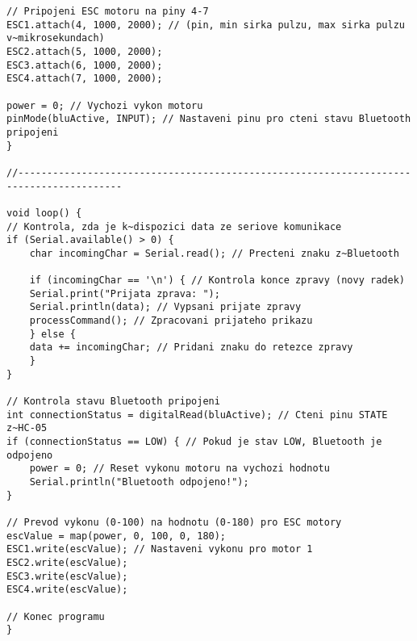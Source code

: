 \documentclass[12pt]{report}
\begin{document}
\begin{appendices}
\begin{lstlisting}[title={}, caption={}, label={}, basicstyle=\footnotesize\ttfamily, inputencoding=utf8]
// Pripojeni ESC motoru na piny 4-7
ESC1.attach(4, 1000, 2000); // (pin, min sirka pulzu, max sirka pulzu v~mikrosekundach)
ESC2.attach(5, 1000, 2000);
ESC3.attach(6, 1000, 2000);
ESC4.attach(7, 1000, 2000);

power = 0; // Vychozi vykon motoru
pinMode(bluActive, INPUT); // Nastaveni pinu pro cteni stavu Bluetooth pripojeni
}

//----------------------------------------------------------------------------------------

void loop() {
// Kontrola, zda je k~dispozici data ze seriove komunikace
if (Serial.available() > 0) {
	char incomingChar = Serial.read(); // Precteni znaku z~Bluetooth

	if (incomingChar == '\n') { // Kontrola konce zpravy (novy radek)
	Serial.print("Prijata zprava: ");
	Serial.println(data); // Vypsani prijate zpravy
	processCommand(); // Zpracovani prijateho prikazu
	} else {
	data += incomingChar; // Pridani znaku do retezce zpravy
	}
}

// Kontrola stavu Bluetooth pripojeni
int connectionStatus = digitalRead(bluActive); // Cteni pinu STATE z~HC-05
if (connectionStatus == LOW) { // Pokud je stav LOW, Bluetooth je odpojeno
	power = 0; // Reset vykonu motoru na vychozi hodnotu
	Serial.println("Bluetooth odpojeno!");
}

// Prevod vykonu (0-100) na hodnotu (0-180) pro ESC motory
escValue = map(power, 0, 100, 0, 180); 
ESC1.write(escValue); // Nastaveni vykonu pro motor 1
ESC2.write(escValue);
ESC3.write(escValue);
ESC4.write(escValue);

// Konec programu
}	
\end{lstlisting}  
\end{appendices}
\end{document}
